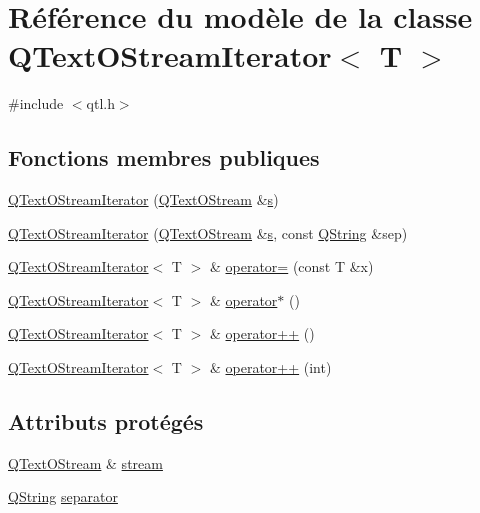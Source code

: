 \hypertarget{class_q_text_o_stream_iterator}{}\section{Référence du modèle de la classe Q\+Text\+O\+Stream\+Iterator$<$ T $>$}
\label{class_q_text_o_stream_iterator}


{\ttfamily \#include $<$qtl.\+h$>$}

\subsection*{Fonctions membres publiques}
\begin{DoxyCompactItemize}
\item 
\hyperlink{class_q_text_o_stream_iterator_a6cb912b389b1bdf8802e03d2ae5eedf9}{Q\+Text\+O\+Stream\+Iterator} (\hyperlink{class_q_text_o_stream}{Q\+Text\+O\+Stream} \&\hyperlink{060__command__switch_8tcl_a011c73f2dbb87635a3b4206c72355f6e}{s})
\item 
\hyperlink{class_q_text_o_stream_iterator_a4554edb576ba1e6cb27b4005448be264}{Q\+Text\+O\+Stream\+Iterator} (\hyperlink{class_q_text_o_stream}{Q\+Text\+O\+Stream} \&\hyperlink{060__command__switch_8tcl_a011c73f2dbb87635a3b4206c72355f6e}{s}, const \hyperlink{class_q_string}{Q\+String} \&sep)
\item 
\hyperlink{class_q_text_o_stream_iterator}{Q\+Text\+O\+Stream\+Iterator}$<$ T $>$ \& \hyperlink{class_q_text_o_stream_iterator_a925f0536b7f32c968c421c7a93c4c7e2}{operator=} (const T \&x)
\item 
\hyperlink{class_q_text_o_stream_iterator}{Q\+Text\+O\+Stream\+Iterator}$<$ T $>$ \& \hyperlink{class_q_text_o_stream_iterator_ac74eaaa9e294245315af82f4344454a8}{operator$\ast$} ()
\item 
\hyperlink{class_q_text_o_stream_iterator}{Q\+Text\+O\+Stream\+Iterator}$<$ T $>$ \& \hyperlink{class_q_text_o_stream_iterator_a815c5f104c33d19c380f3df259ed3a0c}{operator++} ()
\item 
\hyperlink{class_q_text_o_stream_iterator}{Q\+Text\+O\+Stream\+Iterator}$<$ T $>$ \& \hyperlink{class_q_text_o_stream_iterator_ab345224394f90f10399041f45723b832}{operator++} (int)
\end{DoxyCompactItemize}
\subsection*{Attributs protégés}
\begin{DoxyCompactItemize}
\item 
\hyperlink{class_q_text_o_stream}{Q\+Text\+O\+Stream} \& \hyperlink{class_q_text_o_stream_iterator_af29ab04351a36cea2fa2d25ae232d18f}{stream}
\item 
\hyperlink{class_q_string}{Q\+String} \hyperlink{class_q_text_o_stream_iterator_a47ce0aaa5f5932bdde944a7d37cc982c}{separator}
\end{DoxyCompactItemize}


